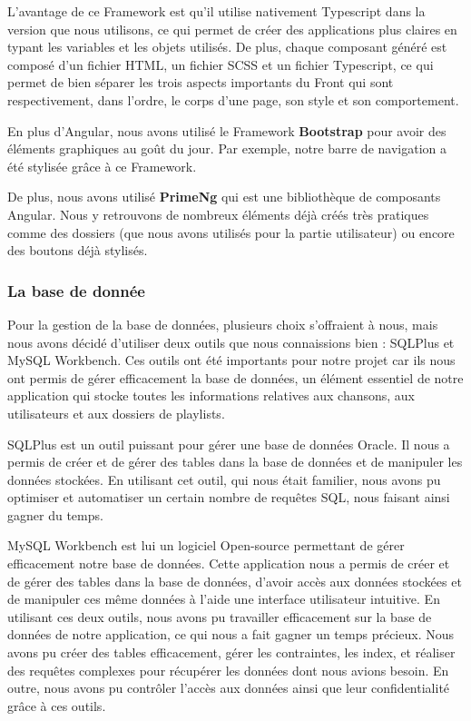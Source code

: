 \documentclass[12pt,french]{article}
\begin{document}
\medskip

L'avantage de ce \gls{Framework} est qu'il utilise nativement \gls{Typescript} dans la version que nous utilisons, ce qui permet de créer des applications plus claires en typant les variables et les objets utilisés. De plus, chaque composant généré est composé d'un fichier \gls{HTML}, un fichier \gls{SCSS} et un fichier \gls{Typescript}, ce qui permet de bien séparer les trois aspects importants du \gls{Front} qui sont respectivement, dans l'ordre, le corps d'une page, son style et son comportement.

\bigskip

En plus d'Angular, nous avons utilisé le \gls{Framework} \textbf{Bootstrap} pour avoir des éléments graphiques au goût du jour. Par exemple, notre barre de navigation a été stylisée grâce à ce \gls{Framework}.

De plus, nous avons utilisé \textbf{PrimeNg} qui est une bibliothèque de composants Angular. Nous y retrouvons de nombreux éléments déjà créés très pratiques comme des dossiers (que nous avons utilisés pour la partie utilisateur) ou encore des boutons déjà stylisés.

\subsubsection{La base de donnée}

Pour la gestion de la base de données, plusieurs choix s'offraient à nous, mais nous avons décidé d'utiliser deux outils que nous connaissions bien : SQLPlus et MySQL Workbench. Ces outils ont été importants pour notre projet car ils nous ont permis de gérer efficacement la base de données, un élément essentiel de notre application qui stocke toutes les informations relatives aux chansons, aux utilisateurs et aux dossiers de playlists.
\newline

SQLPlus est un outil puissant pour gérer une base de données Oracle. Il nous a permis de créer et de gérer des \gls{table}s dans la base de données et de manipuler les données stockées. En utilisant cet outil, qui nous était familier, nous avons pu optimiser et automatiser un certain nombre de requêtes \gls{SQL}, nous faisant ainsi gagner du temps.
\newline

MySQL Workbench est lui un logiciel \gls{Open-source} permettant de gérer efficacement notre base de données. Cette application nous a permis de créer et de gérer des \gls{table}s dans la base de données, d'avoir accès aux données stockées et de manipuler ces même données à l'aide une interface utilisateur intuitive.
\newline
En utilisant ces deux outils, nous avons pu travailler efficacement sur la base de données de notre application, ce qui nous a fait gagner un temps précieux. Nous avons pu créer des \gls{table}s efficacement, gérer les contraintes, les index, et réaliser des requêtes complexes pour récupérer les données dont nous avions besoin. En outre, nous avons pu contrôler l'accès aux données ainsi que leur confidentialité grâce à ces outils.
\end{document}
